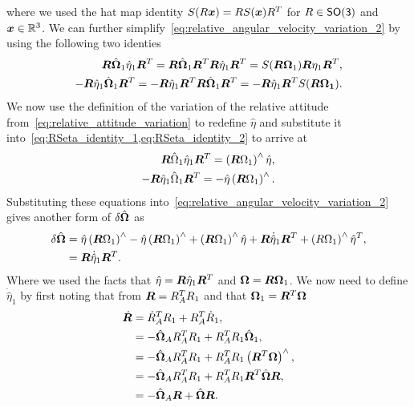 where we used the hat map identity \( S(R \bm{x}) = R S(\bm{x}) R^T\) for \( R \in \mathsf{SO(3)}\) and \( \bm{x} \in \mathbb{R}^3\).
We can further simplify~\cref{eq:relative_angular_velocity_variation_2} by using the following two identies
\begin{align}
    \bm{R} \hat{\bm{\Omega}}_1 \hat{\eta}_1 \bm{R}^T = \bm{R}\hat{\bm{\Omega}}_1 \bm{R}^T \bm{R} \hat{\eta}_1 \bm{R}^T = S(\bm{R} \bm{\Omega}_1) \bm{R} \eta_1 \bm{R}^T , \label{eq:RSeta_identity_1}\\
    -\bm{R} \hat{\eta}_1 \hat{\bm{\Omega}}_1\bm{R}^T = - \bm{R} \hat{\eta}_1 \bm{R}^T \bm{R} \hat{\bm{\Omega}}_1\bm{R}^T = -\bm{R} \hat{\eta}_1 \bm{R}^T S(\bm{R} \bm{\Omega_1}) . \label{eq:RSeta_identity_2}
\end{align}
We now use the definition of the variation of the relative attitude from~\cref{eq:relative_attitude_variation} to redefine \( \hat{\eta}\) and substitute it into~\cref{eq:RSeta_identity_1,eq:RSeta_identity_2} to arrive at
\begin{align*}
    \bm{R} \hat{\Omega}_1 \hat{\eta}_1 \bm{R}^T = \left( \bm{R} \Omega_1 \right)^\wedge \hat{\eta} , \\
    - \bm{R} \hat{\eta}_1 \hat{\Omega}_1 \bm{R}^T = -\hat{\eta} \left( \bm{R}\Omega_1 \right)^\wedge.
\end{align*}
Substituting these equations into~\cref{eq:relative_angular_velocity_variation_2} gives another form of \( \delta \hat{\bm{\Omega}}\) as
\begin{align}\label{eq:relative_angular_velocity_variation_3}
    \delta \hat{\bm{\Omega}} &= \hat{\eta} \left( \bm{R} \Omega_1 \right)^\wedge - \hat{\eta} \left( \bm{R} \Omega_1 \right)^\wedge + \left( \bm{R} \Omega_1 \right)^\wedge \hat{\eta} + \bm{R} \dot{\hat{\eta}}_1 \bm{R}^T + \left( R \Omega_1 \right)^\wedge \hat{\eta}^T , \\
                             &= \bm{R} \dot{\hat{\eta}}_1 \bm{R}^T .
\end{align}
Where we used the facts that \( \hat{\eta} = \bm{R} \hat{\eta}_1 \bm{R}^T \) and \( \bm{\Omega} = \bm{R} \bm{\Omega}_1\). 
We now need to define \( \dot{\hat{\eta}}_1\) by first noting that from \( \bm{R} = R_A^T R_1\) and that \( \bm{\Omega}_1 = \bm{R}^T \bm{\Omega}\)
\begin{align}\label{eq:relR_dot}
    \dot{\bm{R}} &= \dot{R}_A^T R_1 + R_A^T \dot{R}_1 , \nonumber\\
                 &= - \hat{\bm{\Omega}}_A R_A^T R_1 + R_A^T R_1 \hat{\bm{\Omega}}_1 ,\nonumber\\
                 &= -\hat{\bm{\Omega}}_A R_A^T R_1 + R_A^T R_1 \left( \bm{R}^T \bm{\Omega} \right)^\wedge , \nonumber\\
                 &= -\hat{\bm{\Omega}}_A R_A^T R_1 + R_A^T R_1 \bm{R}^T \hat{\bm{\Omega}} \bm{R} ,\nonumber\\
                 &= -\hat{\bm{\Omega}}_A\bm{R} + \hat{\bm{\Omega}} \bm{R} .
\end{align}
